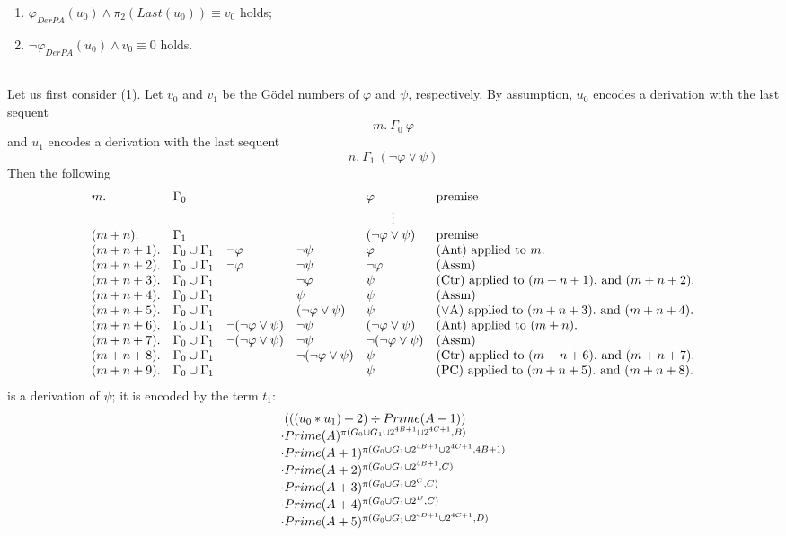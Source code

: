 \documentclass[leqno]{report}
\newcommand{\assm}{{(\mathrm{Assm})}}
\newcommand{\ant}{{(\mathrm{Ant})}}
\newcommand{\pc}{{(\mathrm{PC})}}
\newcommand{\ctr}{{(\mathrm{Ctr})}}
\newcommand{\ora}{{(\lor\mathrm{A})}}
\begin{document}
\begin{enumerate}[1.]
\begin{enumerate}[(1)]
\item $\varphi_{DerPA} (u_0) \land \pi_2 (Last(u_0)) \equiv v_0$ holds;
\item $\neg\varphi_{DerPA} (u_0) \land v_0 \equiv 0$ holds.
\end{enumerate}
\ \\
Let us first consider (1). Let $v_0$ and $v_1$ be the G\"{o}del numbers of $\varphi$ and $\psi$, respectively. By assumption, $u_0$ encodes a derivation with the last sequent
\[
m. \ \Gamma_0 \ \varphi
\]
and $u_1$ encodes a derivation with the last sequent
\[
n. \ \Gamma_1 \ (\neg\varphi \lor \psi )
\]
Then the following
\[
\begin{array}{llllll}
m. & \Gamma_0 & \ & \ & \varphi & \mbox{premise} \cr
\multicolumn{6}{c}{\vdots}\cr
(m + n). & \Gamma_1 & \ & \ & (\neg\varphi \lor \psi ) & \mbox{premise} \cr
(m + n + 1). & \Gamma_0 \cup \Gamma_1 & \neg\varphi & \neg\psi & \varphi & \mbox{$\ant$ applied to $m$.} \cr
(m + n + 2). & \Gamma_0 \cup \Gamma_1 & \neg\varphi & \neg\psi & \neg\varphi & \mbox{$\assm$} \cr
(m + n + 3). & \Gamma_0 \cup \Gamma_1 & \ & \neg\varphi & \psi & \mbox{$\ctr$ applied to $(m + n + 1).$ and $(m + n + 2).$} \cr
(m + n + 4). & \Gamma_0 \cup \Gamma_1 & \ & \psi & \psi & \mbox{$\assm$} \cr
(m + n + 5). & \Gamma_0 \cup \Gamma_1 & \ & (\neg\varphi \lor \psi ) & \psi & \mbox{$\ora$ applied to $(m + n + 3).$ and $(m + n + 4).$} \cr
(m + n + 6). & \Gamma_0 \cup \Gamma_1 & \neg (\neg\varphi \lor \psi ) & \neg\psi & (\neg\varphi \lor \psi ) & \mbox{$\ant$ applied to $(m + n).$} \cr
(m + n + 7). & \Gamma_0 \cup \Gamma_1 & \neg (\neg\varphi \lor \psi ) & \neg\psi & \neg (\neg\varphi \lor \psi ) & \mbox{$\assm$} \cr
(m + n + 8). & \Gamma_0 \cup \Gamma_1 & \ & \neg (\neg\varphi \lor \psi ) & \psi & \mbox{$\ctr$ applied to $(m + n + 6).$ and $(m + n + 7).$} \cr
(m + n + 9). & \Gamma_0 \cup \Gamma_1 & \ & \ & \psi & \mbox{$\pc$ applied to $(m + n + 5).$ and $(m + n + 8).$}
\end{array}
\]
is a derivation of $\psi$; it is encoded by the term $t_1$:
\[
\begin{array}{l}
\phantom{\cdot} (((u_0 \ast u_1) + 2) \div Prime(A - 1)) \cr
\cdot Prime(A)    ^{\pi (G_0 \cup G_1 \cup 2^{4B + 1} \cup 2^{4C + 1}, B)} \cr
\cdot Prime(A + 1)^{\pi (G_0 \cup G_1 \cup 2^{4B + 1} \cup 2^{4C + 1}, 4B + 1)} \cr
\cdot Prime(A + 2)^{\pi (G_0 \cup G_1 \cup 2^{4B + 1}, C)} \cr
\cdot Prime(A + 3)^{\pi (G_0 \cup G_1 \cup 2^C, C)} \cr
\cdot Prime(A + 4)^{\pi (G_0 \cup G_1 \cup 2^D, C)} \cr
\cdot Prime(A + 5)^{\pi (G_0 \cup G_1 \cup 2^{4D + 1} \cup 2^{4C + 1}, D)} \cr

\end{array}\]
\end{enumerate}
\end{document}
